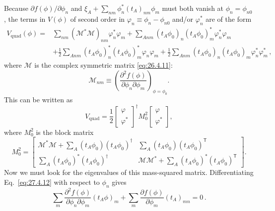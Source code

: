 Because \(\partial f(\phi)/\partial\phi_n\) and
\(\xi_A+\sum_{nm}\phi_n^*(t_A)_{nm}\phi_m\) must both vanish at
\(\phi_n=\phi_{n0}\), the terms in \(V(\phi)\) of second order in
\(\varphi_n\equiv\phi_n-\phi_{n0}\) and/or \(\varphi_n^*\) are of the form
\begin{equation}
  \begin{aligned}
  V_{\mathrm{quad}}(\phi)={}&
  \sum_{nm}(\mathcal{M}^*\mathcal{M})_{nm}\varphi_n^*\varphi_m
  +\sum_{Anm}(t_A\phi_0)_n(t_A\phi_0)_m^*
    \varphi_n^*\varphi_m
  \\
  &+\frac12\sum_{Anm}
    (t_A\phi_0)_n^*(t_A\phi_0)_m^*\varphi_n\varphi_m
  +\frac12\sum_{Anm}
    (t_A\phi_0)_n(t_A\phi_0)_m\varphi_n^*\varphi_m^*\,,
  \end{aligned}
  \tag{27.4.15}\label{eq:27.4.15}
\end{equation}
where \(\mathcal{M}\) is the complex symmetric matrix \eqref{eq:26.4.11}:
\[
  \mathcal{M}_{nm}
  \equiv
  \left(
    \frac{\partial^2f(\phi)}{\partial\phi_n\partial\phi_m}
  \right)_{\phi=\phi_0}.
\]
This can be written as
\begin{equation}
  V_{\mathrm{quad}}
  =\frac12
  \begin{bmatrix}\varphi\\ \varphi^*\end{bmatrix}^{\!\dagger}
  M_0^2
  \begin{bmatrix}\varphi\\ \varphi^*\end{bmatrix},
  \tag{27.4.16}\label{eq:27.4.16}
\end{equation}
where \(M_0^2\) is the block matrix
\begin{equation}
  M_0^2=
  \begin{bmatrix}
  \mathcal{M}^*\mathcal{M}
    +\sum_A(t_A\phi_0)(t_A\phi_0)^\dagger
  &
  \sum_A(t_A\phi_0)(t_A\phi_0)^{\mathsf T}
  \\
  \sum_A(t_A\phi_0)^*(t_A\phi_0)^\dagger
  &
  \mathcal{M}\mathcal{M}^*
    +\sum_A(t_A\phi_0)^*(t_A\phi_0)^{\mathsf T}
  \end{bmatrix}.
  \tag{27.4.17}\label{eq:27.4.17}
\end{equation}
Now we must look for the eigenvalues of this mass-squared matrix.
Differentiating Eq.~\eqref{eq:27.4.12} with respect to \(\phi_n\) gives
\begin{equation}
  \sum_m
  \frac{\partial^2f(\phi)}{\partial\phi_n\partial\phi_m}
  (t_A\phi)_m
  +\sum_m\frac{\partial f(\phi)}{\partial\phi_m}(t_A)_{mn}
  =0\,.
  \tag{27.4.18}\label{eq:27.4.18}
\end{equation}
